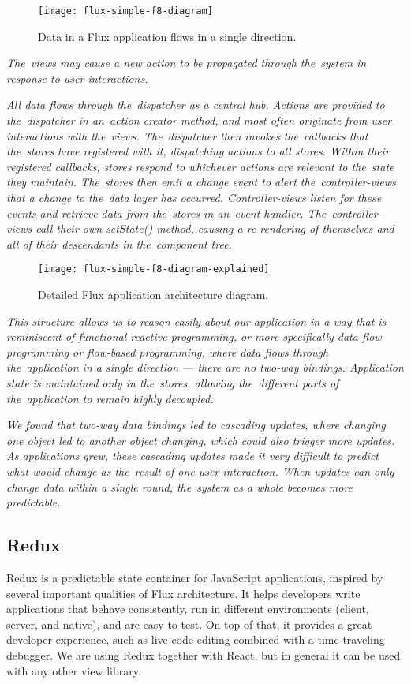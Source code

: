 \begin{figure}[ht!]
\centering
\texttt{[image: flux-simple-f8-diagram]}
\caption{Data in a Flux application flows in a single direction. \citep{flux}}
\label{r:42}
\end{figure}

\textsl{The~views may cause a new action to be propagated through the~system in response to user interactions.} \citep{flux}

\textsl{All data flows through the~dispatcher as a central hub. Actions are provided to the~dispatcher in an~action creator method, and most often originate from user interactions with the~views. The~dispatcher then invokes the~callbacks that the~stores have registered with it, dispatching actions to all stores. Within their registered callbacks, stores respond to whichever actions are relevant to the~state they maintain. The~stores then emit a change event to alert the~controller-views that a change to the~data layer has occurred. Controller-views listen for these events and retrieve data from the~stores in an~event handler. The~controller-views call their own setState() method, causing a re-rendering of themselves and all of their descendants in the~component tree.} \citep{flux}

\begin{figure}[ht!]
\centering
\texttt{[image: flux-simple-f8-diagram-explained]}
\caption{Detailed Flux application architecture diagram. \citep{flux}}
\label{r:43}
\end{figure}

\textsl{This structure allows us to reason easily about our application in a way that is reminiscent of functional reactive programming, or more specifically data-flow programming or flow-based programming, where data flows through the~application in a single direction — there are no two-way bindings. Application state is maintained only in the~stores, allowing the~different parts of the~application to remain highly decoupled.} \citep{flux}

\textsl{We found that two-way data bindings led to cascading updates, where changing one object led to another object changing, which could also trigger more updates. As applications grew, these cascading updates made it very difficult to predict what would change as the~result of one user interaction. When updates can only change data within a single round, the~system as a whole becomes more predictable.} \citep{flux}

\subsection{Redux}
Redux is a predictable state container for JavaScript applications, inspired by several important qualities of Flux architecture. It helps developers write applications that behave consistently, run in different environments (client, server, and native), and are easy to test. On top of that, it provides a great developer experience, such as live code editing combined with a time traveling debugger.\citep{redux-intro} We are using Redux together with React, but in general it can be used with any other view library.

